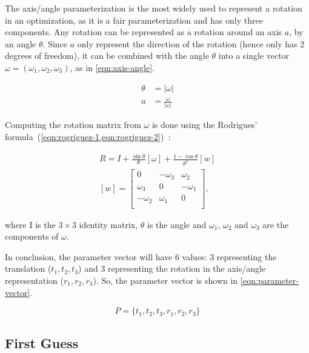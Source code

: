 \documentclass[conference]{IEEEtran}
\begin{document}
The axis/angle parameterization is the most widely used to represent a rotation in an optimization, as it is a fair parameterization and has only three components. Any rotation can be represented as a rotation around an axis $a$, by an angle $\theta$. Since $a$ only represent the direction of the rotation (hence only has 2 degrees of freedom), it can be combined with the angle $\theta$ into a single vector $\omega = \left(\omega_1, \omega_2, \omega_3\right)$, as in \cref{eqn:axis-angle}.

\begin{equation}
    \label{eqn:axis-angle}
    \begin{aligned}
        \theta & = |\omega| \\
        a & = \frac{\omega}{|\omega|}
    \end{aligned}
\end{equation}

Computing the rotation matrix from $\omega$ is done using the Rodrigues' formula~(\cref{eqn:rogriguez-1,eqn:rogriguez-2})~\cite{schmidt01}:

\begin{align}
    \label{eqn:rogriguez-1}
    R = I + \frac{\sin \theta}{\theta} [\omega] + \frac{1 - \cos \theta}{\theta^2} [w] \\
    \label{eqn:rogriguez-2}
    [w] = \left[
        \begin{array}{ccc}
            0  & -\omega_3 & \omega_2 \\
            \omega_3 & 0   & -\omega_1 \\
            -\omega_2 & \omega_1 & 0 \\
        \end{array}
    \right],
\end{align}

\noindent
where I is the $3\times3$ identity matrix, $\theta$ is the angle and $\omega_1$, $\omega_2$ and $\omega_3$ are the components of $\omega$.

In conclusion, the parameter vector will have 6 values: 3 representing the translation ($t_1, t_2, t_3$) and 3 representing the rotation in the axis/angle representation ($r_1, r_2, r_3$). So, the parameter vector is shown in \cref{eqn:parameter-vector}.

\begin{equation}
    \label{eqn:parameter-vector}
    P = \{t_1, t_2, t_3, r_1, r_2, r_3\}
\end{equation}

\subsection{First Guess}
\end{document}
